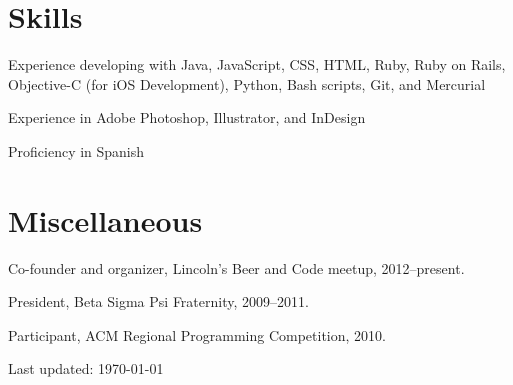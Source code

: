 \documentclass[10pt,letterpaper]{article}
\renewenvironment{itemize}{
  \begin{list}{}{
    \setlength{\leftmargin}{1.5em}
    \setlength{\itemsep}{0.25em}
    \setlength{\parskip}{0pt}
    \setlength{\parsep}{0.25em}
  }
}{
  \end{list}
}
\begin{document}

\section*{Skills}

\begin{itemize}
    \item Experience developing with Java, JavaScript, CSS, HTML, Ruby, Ruby on Rails,
    Objective-C (for iOS Development), Python, Bash scripts, Git, and Mercurial
    \item Experience in Adobe Photoshop, Illustrator, and InDesign
    \item Proficiency in Spanish
\end{itemize}

\section*{Miscellaneous}

\begin{itemize}
    \item Co-founder and organizer, Lincoln's Beer and Code meetup, 2012--present.
    \item President, Beta Sigma Psi Fraternity, 2009--2011.
    \item Participant, ACM Regional Programming Competition, 2010.
\end{itemize}

\bigskip

\begin{center}
  \begin{small}
    Last updated: \today
  \end{small}
\end{center}
\end{document}
